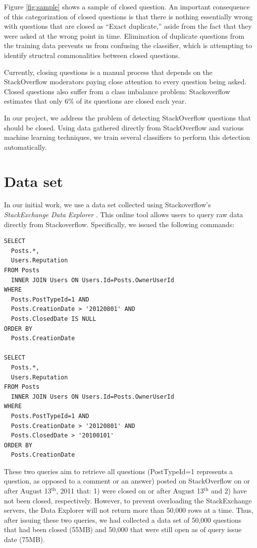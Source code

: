 \documentclass[11pt]{article}
\begin{document}
 Figure \ref{fig:sample} shows a sample of closed question. An important consequence of this categorization of closed questions is that there is nothing essentially wrong with questions that are closed as ``Exact duplicate,'' aside from the fact that they were asked at the wrong point in time. Elimination of duplicate questions from the training data prevents us from confusing the classifier, which is attempting to identify structral commonalities between closed questions.

 Currently, closing questions is a manual process that
depends on the StackOverflow moderators paying close attention to every
question being asked. Closed questions also suffer from a class imbalance problem:
Stackoverflow estimates that only 6\% of its questions are closed each
year.

 In our project, we address the problem of detecting StackOverflow
questions that should be closed.  Using data gathered directly from
StackOverflow and various machine learning techniques, we train several classifiers to perform this detection automatically.

\section{Data set}
In our initial work, we use a data set collected using
Stackoverflow's \emph{StackExchange Data Explorer}
\cite{website:stackexchange}. This online tool
allows users to query raw data directly from
Stackoverflow. Specifically, we issued the following commands:

\begin{verbatim}
SELECT
  Posts.*,
  Users.Reputation
FROM Posts
  INNER JOIN Users ON Users.Id=Posts.OwnerUserId
WHERE
  Posts.PostTypeId=1 AND
  Posts.CreationDate > '20120801' AND
  Posts.ClosedDate IS NULL
ORDER BY
  Posts.CreationDate

SELECT
  Posts.*,
  Users.Reputation
FROM Posts
  INNER JOIN Users ON Users.Id=Posts.OwnerUserId
WHERE
  Posts.PostTypeId=1 AND
  Posts.CreationDate > '20120801' AND
  Posts.ClosedDate > '20100101'
ORDER BY
  Posts.CreationDate
\end{verbatim}

These two queries aim to retrieve all questions (PostTypeId=1 represents a question, as opposed to a comment or an answer) posted on StackOverflow on or after August 13$^{\textrm{th}}$, 2011 that: 1)
were closed on or after August 13$^{\textrm{th}}$ and 2) have not been
closed, respectively.  However, to prevent overloading the StackExchange servers, the Data
Explorer will not return more than 50,000 rows at a time.  Thus, after
issuing these two queries, we had collected a data set of 50,000
questions that had been closed (55MB) and 50,000 that were still open as of
query issue date (75MB).
\end{document}
